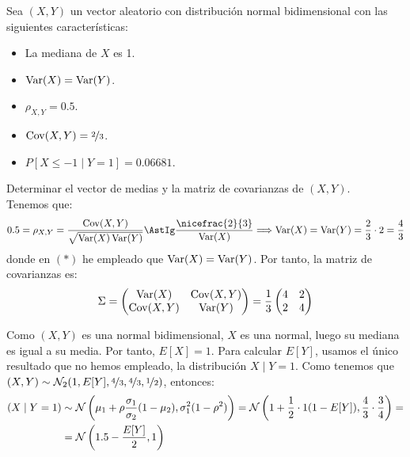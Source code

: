 \begin{ejercicio}
    Sea $(X,Y)$ un vector aleatorio con distribución normal bidimensional con las siguientes características:
    \begin{itemize}
        \item La mediana de $X$ es 1.
        \item $\operatorname{Var}(X) = \operatorname{Var}(Y)$.
        \item $\rho_{X,Y} = 0.5$.
        \item $\operatorname{Cov}(X,Y) = \nicefrac{2}{3}$.
        \item $P[X\leq -1\mid Y = 1] = 0.06681$.
    \end{itemize}
    Determinar el vector de medias y la matriz de covarianzas de $(X,Y)$.\\

    Tenemos que:
    \begin{equation*}
        0.5 = \rho_{X,Y} = \dfrac{\Cov(X,Y)}{\sqrt{\Var(X)\Var(Y)}} \AstIg \dfrac{\nicefrac{2}{3}}{\Var(X)}\Longrightarrow \Var(X) = \Var(Y)=\frac{2}{3}\cdot 2 = \frac{4}{3}
    \end{equation*}
    donde en $(\ast)$ he empleado que $\operatorname{Var}(X) = \operatorname{Var}(Y)$. Por tanto, la matriz de covarianzas es:
    \begin{equation*}
        \Sigma = \begin{pmatrix}
            \operatorname{Var}(X) & \operatorname{Cov}(X,Y)\\
            \operatorname{Cov}(X,Y) & \operatorname{Var}(Y)
        \end{pmatrix} = \frac{1}{3}\begin{pmatrix}
            4 & 2\\
            2 & 4
        \end{pmatrix}
    \end{equation*}

    Como $(X,Y)$ es una normal bidimensional, $X$ es una normal, luego su mediana es igual a su media. Por tanto, $E[X]=1$.
    Para calcular $E[Y]$, usamos el único resultado que no hemos empleado, la distribución $X\mid Y=1$. Como tenemos que $(X,Y)\sim \mathcal{N}_2(1,E[Y],\nicefrac{4}{3},\nicefrac{4}{3}, \nicefrac{1}{2})$, entonces:
    \begin{align*}
        (X\mid Y=1)&\sim \mathcal{N}\left(\mu_1+\rho\dfrac{\sigma_1}{\sigma_2}(1-\mu_2),\sigma_1^2(1-\rho^2)\right)
        = \mathcal{N}\left(1+\dfrac{1}{2}\cdot 1(1-E[Y]),\dfrac{4}{3}\cdot \dfrac{3}{4}\right)
        =\\&= \mathcal{N}\left(1.5-\dfrac{E[Y]}{2},1\right)
    \end{align*}


\end{ejercicio}
